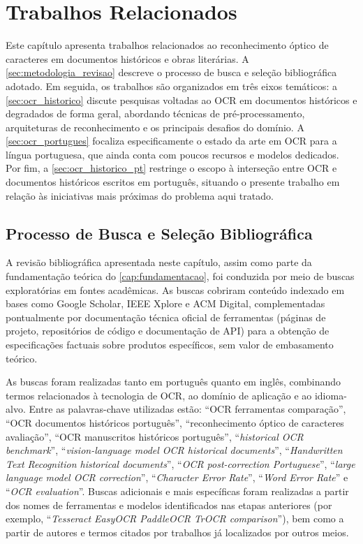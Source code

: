 \documentclass[noabntexcite,oneside]{ufsc-thesis-rn46-2019}
\begin{document}
\chapter{Trabalhos Relacionados}
\label{cap:relacionados}

Este capítulo apresenta trabalhos relacionados ao reconhecimento óptico de caracteres em
documentos históricos e obras literárias. A \autoref{sec:metodologia_revisao} descreve
o processo de busca e seleção bibliográfica adotado. Em seguida, os trabalhos são
organizados em três eixos temáticos: a \autoref{sec:ocr_historico} discute pesquisas
voltadas ao OCR em documentos históricos e degradados de forma geral, abordando técnicas
de pré-processamento, arquiteturas de reconhecimento e os principais desafios do domínio.
A \autoref{sec:ocr_portugues} focaliza especificamente o estado da arte em OCR para a
língua portuguesa, que ainda conta com poucos recursos e modelos dedicados.
Por fim, a \autoref{sec:ocr_historico_pt} restringe o escopo à interseção entre OCR e
documentos históricos escritos em português, situando o presente trabalho em relação às
iniciativas mais próximas do problema aqui tratado.

\section{Processo de Busca e Seleção Bibliográfica}
\label{sec:metodologia_revisao}

A revisão bibliográfica apresentada neste capítulo, assim como parte da fundamentação
teórica do \autoref{cap:fundamentacao}, foi conduzida por meio de buscas exploratórias em fontes
acadêmicas. As buscas
cobriram conteúdo indexado em bases como Google Scholar, IEEE Xplore e ACM Digital, complementadas pontualmente por
documentação técnica oficial de ferramentas (páginas de projeto, repositórios de código
e documentação de API) para a obtenção de especificações factuais sobre produtos
específicos, sem valor de embasamento teórico.

As buscas foram realizadas tanto em português quanto em inglês, combinando termos
relacionados à tecnologia de OCR, ao domínio de aplicação e ao idioma-alvo. Entre as
palavras-chave utilizadas estão: ``OCR ferramentas comparação'', ``OCR documentos
históricos português'', ``reconhecimento óptico de caracteres avaliação'', ``OCR
manuscritos históricos português'', ``\textit{historical OCR benchmark}'',
``\textit{vision-language model OCR historical documents}'', ``\textit{Handwritten Text
Recognition historical documents}'', ``\textit{OCR post-correction Portuguese}'',
``\textit{large language model OCR correction}'', ``\textit{Character Error Rate}'',
``\textit{Word Error Rate}'' e ``\textit{OCR evaluation}''. Buscas adicionais e mais
específicas foram realizadas a partir dos nomes de ferramentas e modelos identificados nas
etapas anteriores (por exemplo, ``\textit{Tesseract EasyOCR PaddleOCR TrOCR
comparison}''), bem como a partir de autores e termos citados por
trabalhos já localizados por outros meios.
\end{document}
